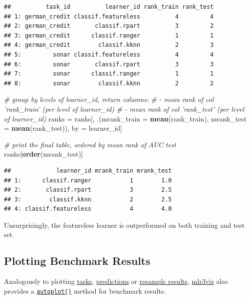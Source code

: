 \documentclass[]{scrbook}
\newenvironment{Shaded}{\begin{snugshade}}{\end{snugshade}}
\newcommand{\CommentTok}[1]{\textcolor[rgb]{0.56,0.35,0.01}{\textit{#1}}}
\newcommand{\DataTypeTok}[1]{\textcolor[rgb]{0.13,0.29,0.53}{#1}}
\newcommand{\KeywordTok}[1]{\textcolor[rgb]{0.13,0.29,0.53}{\textbf{#1}}}
\newcommand{\NormalTok}[1]{#1}
\newcommand{\StringTok}[1]{\textcolor[rgb]{0.31,0.60,0.02}{#1}}
\renewenvironment{Shaded} {\begin{snugshade}\small} {\end{snugshade}}
\begin{document}
\begin{verbatim}
##          task_id          learner_id rank_train rank_test
## 1: german_credit classif.featureless          4         4
## 2: german_credit       classif.rpart          3         2
## 3: german_credit      classif.ranger          1         1
## 4: german_credit        classif.kknn          2         3
## 5:         sonar classif.featureless          4         4
## 6:         sonar       classif.rpart          3         3
## 7:         sonar      classif.ranger          1         1
## 8:         sonar        classif.kknn          2         2
\end{verbatim}

\begin{Shaded}
\begin{Highlighting}[]
\CommentTok{# group by levels of learner_id, return columns:}
\CommentTok{# - mean rank of col 'rank_train' (per level of learner_id)}
\CommentTok{# - mean rank of col 'rank_test' (per level of learner_id)}
\NormalTok{ranks =}\StringTok{ }\NormalTok{ranks[, .(}\DataTypeTok{mrank_train =} \KeywordTok{mean}\NormalTok{(rank_train), }\DataTypeTok{mrank_test =} \KeywordTok{mean}\NormalTok{(rank_test)), by =}\StringTok{ }\NormalTok{learner_id]}

\CommentTok{# print the final table, ordered by mean rank of AUC test}
\NormalTok{ranks[}\KeywordTok{order}\NormalTok{(mrank_test)]}
\end{Highlighting}
\end{Shaded}

\begin{verbatim}
##             learner_id mrank_train mrank_test
## 1:      classif.ranger           1        1.0
## 2:       classif.rpart           3        2.5
## 3:        classif.kknn           2        2.5
## 4: classif.featureless           4        4.0
\end{verbatim}

Unsurprisingly, the featureless learner is outperformed on both training and test set.

\hypertarget{autoplot-benchmarkresult}{%
\subsection{Plotting Benchmark Results}\label{autoplot-benchmarkresult}}

Analogously to plotting \protect\hyperlink{autoplot-task}{tasks}, \protect\hyperlink{autoplot-prediction}{predictions} or \protect\hyperlink{autoplot-resampleresult}{resample results}, \href{https://mlr3viz.mlr-org.com}{mlr3viz} also provides a \href{https://www.rdocumentation.org/packages/ggplot2/topics/autoplot}{\texttt{autoplot()}} method for benchmark results.
\end{document}
